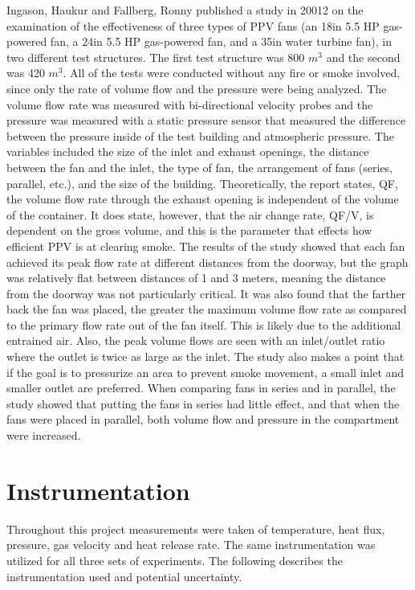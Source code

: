 \documentclass{article}
\begin{document}
Ingason, Haukur and Fallberg, Ronny published a study in 20012 on the examination of the effectiveness of three types of PPV fans (an 18in 5.5 HP gas-powered fan, a 24in 5.5 HP gas-powered fan, and a 35in water turbine fan), in two different test structures. The first test structure was 800 $m^3$ and the second was 420 $m^3$. All of the tests were conducted without any fire or smoke involved, since only the rate of volume flow and the pressure were being analyzed. The volume flow rate was measured with bi-directional velocity probes and the pressure was measured with a static pressure sensor that measured the difference between the pressure inside of the test building and atmospheric pressure. The variables included the size of the inlet and exhaust openings, the distance between the fan and the inlet, the type of fan, the arrangement of fans (series, parallel, etc.), and the size of the building. Theoretically, the report states, QF, the volume flow rate through the exhaust opening is independent of the volume of the container. It does state, however, that the air change rate, QF/V, is dependent on the gross volume, and this is the parameter that effects how efficient PPV is at clearing smoke. The results of the study showed that each fan achieved its peak flow rate at different distances from the doorway, but the graph was relatively flat between distances of 1 and 3 meters, meaning the distance from the doorway was not particularly critical. It was also found that the farther back the fan was placed, the greater the maximum volume flow rate as compared to the primary flow rate out of the fan itself. This is likely due to the additional entrained air. Also, the peak volume flows are seen with an inlet/outlet ratio where the outlet is twice as large as the inlet. The study also makes a point that if the goal is to pressurize an area to prevent smoke movement, a small inlet and smaller outlet are preferred. When comparing fans in series and in parallel, the study showed that putting the fans in series had little effect, and that when the fans were placed in parallel, both volume flow and pressure in the compartment were increased.\cite{PPVmediumhouse}

\clearpage

\section{Instrumentation}
Throughout this project measurements were taken of temperature, heat flux, pressure, gas velocity and heat release rate. The same instrumentation was utilized for all three sets of experiments. The following describes the instrumentation used and potential uncertainty.
\end{document}
